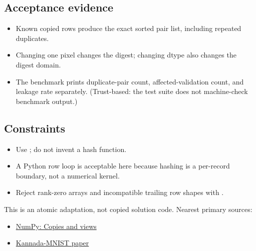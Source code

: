         \subsection{Acceptance evidence}

        \begin{evidencebox}
        \begin{itemize}
          \item Known copied rows produce the exact sorted pair list, including repeated duplicates.
  \item Changing one pixel changes the digest; changing dtype also changes the digest domain.
  \item The benchmark prints duplicate-pair count, affected-validation count, and leakage rate separately. (Trust-based: the test suite does not machine-check benchmark output.)
        \end{itemize}
        \end{evidencebox}

        \subsection{Constraints}

        \begin{itemize}
          \item Use ; do not invent a hash function.
  \item A Python row loop is acceptable here because hashing is a per-record boundary, not a numerical kernel.
  \item Reject rank-zero arrays and incompatible trailing row shapes with .
        \end{itemize}

        \begin{sourcebox}
        This is an atomic adaptation, not copied solution code. Nearest primary sources:
        \begin{itemize}
          \item \href{https://numpy.org/doc/stable/user/basics.copies.html}{NumPy: Copies and views}
  \item \href{https://arxiv.org/abs/1908.01242}{Kannada-MNIST paper}
        \end{itemize}
        \end{sourcebox}
